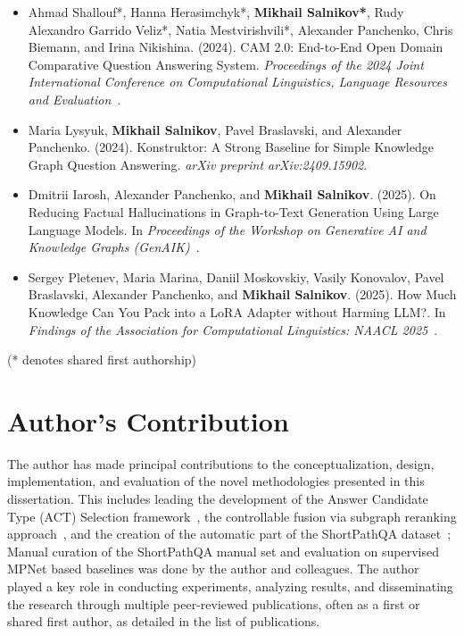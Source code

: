 \begin{itemize}
    \item Ahmad Shallouf*, Hanna Herasimchyk*, \textbf{Mikhail Salnikov*}, Rudy Alexandro Garrido Veliz*, Natia Mestvirishvili*, Alexander Panchenko, Chris Biemann, and Irina Nikishina. (2024). CAM 2.0: End-to-End Open Domain Comparative Question Answering System. \textit{Proceedings of the 2024 Joint International Conference on Computational Linguistics, Language Resources and Evaluation}~\cite{DBLP:conf/coling/ShalloufHSVMPBN24}.
    \item Maria Lysyuk, \textbf{Mikhail Salnikov}, Pavel Braslavski, and Alexander Panchenko. (2024). Konstruktor: A Strong Baseline for Simple Knowledge Graph Question Answering. \textit{arXiv preprint arXiv:2409.15902}.
    \item Dmitrii Iarosh, Alexander Panchenko, and \textbf{Mikhail Salnikov}. (2025). On Reducing Factual Hallucinations in Graph-to-Text Generation Using Large Language Models. In \textit{Proceedings of the Workshop on Generative AI and Knowledge Graphs (GenAIK)}~\cite{iarosh-etal-2025-reducing}.
    \item Sergey Pletenev, Maria Marina, Daniil Moskovskiy, Vasily Konovalov, Pavel Braslavski, Alexander Panchenko, and \textbf{Mikhail Salnikov}. (2025). How Much Knowledge Can You Pack into a LoRA Adapter without Harming LLM?. In \textit{Findings of the Association for Computational Linguistics: NAACL 2025}~\cite{pletenev-etal-2025-much}.
\end{itemize}
(* denotes shared first authorship)

\section*{Author's Contribution}
\label{sec:synopsis:contribution}
The author has made principal contributions to the conceptualization, design, implementation, and evaluation of the novel methodologies presented in this dissertation. This includes leading the development of the Answer Candidate Type (ACT) Selection framework~\cite{DBLP:journals/corr/abs-2310-07008}, the controllable fusion via subgraph reranking approach~\cite{DBLP:journals/corr/abs-2310-02166}, and the creation of the automatic part of the ShortPathQA dataset~\cite{DBLP:conf/nldb/SalnikovSPQA25}; Manual curation of the ShortPathQA manual set and evaluation on supervised MPNet based baselines was done by the author and colleagues. The author played a key role in conducting experiments, analyzing results, and disseminating the research through multiple peer-reviewed publications, often as a first or shared first author, as detailed in the list of publications.

